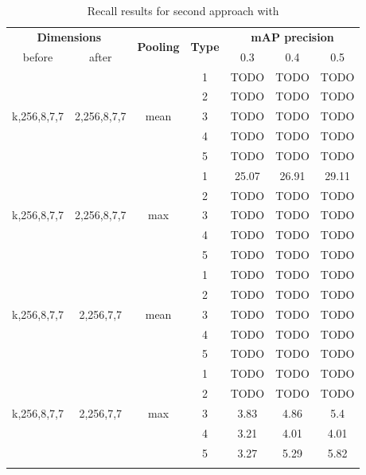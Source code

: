\documentclass{report}
\begin{document}
\begin{center}
\begin{longtable}{||c | c| c| c||c c c||}

  \hline
 \multicolumn{2}{||c|}{\textbf{Dimensions}} & \multirow{2}{*}{\textbf{Pooling}} &\multirow{2}{*}{ \textbf{Type}} &\multicolumn{3}{|c||}{\textbf{mAP precision}}\\

  before & after & {} & {} & 0.3 &  0.4 & 0.5 \\
  \hline   \hline

  \multirow{5}{*}{k,256,8,7,7} & \multirow{5}{*}{2,256,8,7,7} & \multirow{5}{*}{mean}  & 1 & TODO & TODO & TODO \\
  \cline{4-7}

  {} & {} & {} & 2 & TODO & TODO & TODO \\
  \cline{4-7}
  {} & {} & {} & 3 & TODO & TODO & TODO \\
  \cline{4-7}
  {} & {} & {} & 4 & TODO & TODO & TODO \\
  \cline{4-7}
  {} & {} & {} & 5 & TODO & TODO & TODO \\
  \hline

  \multirow{5}{*}{k,256,8,7,7} & \multirow{5}{*}{2,256,8,7,7} & \multirow{5}{*}{max}  & 1 & 25.07 & 26.91 & 29.11 \\
  \cline{4-7}

  {} & {} & {} & 2 & TODO & TODO & TODO \\
  \cline{4-7}
  {} & {} & {} & 3 & TODO & TODO & TODO \\
  \cline{4-7}
  {} & {} & {} & 4 & TODO & TODO & TODO \\
  \cline{4-7}
  {} & {} & {} & 5 & TODO & TODO & TODO \\

  \hline   \hline
  \multirow{5}{*}{k,256,8,7,7} & \multirow{5}{*}{2,256,7,7} & \multirow{5}{*}{mean}  & 1 & TODO & TODO & TODO \\
  \cline{4-7}
  {} & {} & {} & 2 & TODO & TODO & TODO \\
  \cline{4-7}
  {} & {} & {} & 3 & TODO & TODO & TODO \\
  \cline{4-7}
  {} & {} & {} & 4 & TODO & TODO & TODO \\
  \cline{4-7}
  {} & {} & {} & 5 & TODO & TODO & TODO \\
  \hline   

  \multirow{5}{*}{k,256,8,7,7} & \multirow{5}{*}{2,256,7,7} & \multirow{5}{*}{max}  & 1 & TODO & TODO & TODO \\
  \cline{4-7}
  {} & {} & {} & 2 & TODO & TODO & TODO \\
  \cline{4-7}
  {} & {} & {} & 3 & 3.83 & 4.86 & 5.4   \\
  \cline{4-7}
  {} & {} & {} & 4 & 3.21 & 4.01 & 4.01   \\
  \cline{4-7}
  {} & {} & {} & 5 & 3.27 & 5.29 & 5.82   \\
  \hline   


  \caption{Recall results for second approach with  }
  \label{table:svm_temp_pooling}
\end{longtable} 
\end{center}
  
\end{document}
